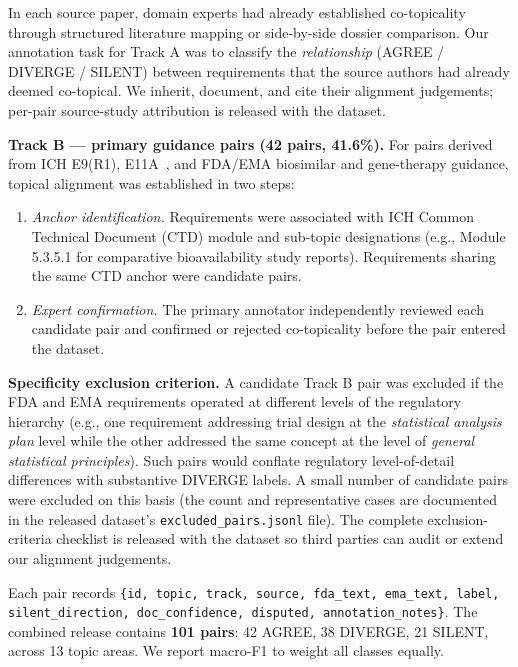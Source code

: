 \documentclass[manuscript]{acmart}
\begin{document}
In each source paper, domain experts had already established co-topicality
through structured literature mapping or side-by-side dossier comparison.
Our annotation task for Track A was to classify the \textit{relationship}
(AGREE / DIVERGE / SILENT) between requirements that the source authors had
already deemed co-topical. We inherit, document, and cite their alignment
judgements; per-pair source-study attribution is released with the dataset.

\textbf{Track B --- primary guidance pairs (42 pairs, 41.6\%).}
For pairs derived from ICH E9(R1), E11A~\cite{iche11a2024}, and FDA/EMA
biosimilar and gene-therapy guidance, topical alignment was established in
two steps:

\begin{enumerate}
\item \textit{Anchor identification.} Requirements were associated with ICH
  Common Technical Document (CTD) module and sub-topic designations (e.g.,
  Module 5.3.5.1 for comparative bioavailability study reports). Requirements
  sharing the same CTD anchor were candidate pairs.
\item \textit{Expert confirmation.} The primary annotator independently
  reviewed each candidate pair and confirmed or rejected co-topicality before
  the pair entered the dataset.
\end{enumerate}

\textbf{Specificity exclusion criterion.}
A candidate Track B pair was excluded if the FDA and EMA requirements operated
at different levels of the regulatory hierarchy (e.g., one requirement
addressing trial design at the \textit{statistical analysis plan} level while
the other addressed the same concept at the level of \textit{general
statistical principles}). Such pairs would conflate regulatory
level-of-detail differences with substantive DIVERGE labels.
A small number of candidate pairs were excluded on this basis (the count and
representative cases are documented in the released dataset's
\texttt{excluded\_pairs.jsonl} file). The complete exclusion-criteria checklist
is released with the dataset so third parties can audit or extend our alignment
judgements.

Each pair records
\texttt{\{id, topic, track, source, fda\_text, ema\_text, label,
silent\_direction, doc\_confidence, disputed, annotation\_notes\}}.
The combined release contains \textbf{101 pairs}: 42 AGREE, 38 DIVERGE, 21
SILENT, across 13 topic areas. We report macro-F1 to weight all classes equally.
\end{document}
